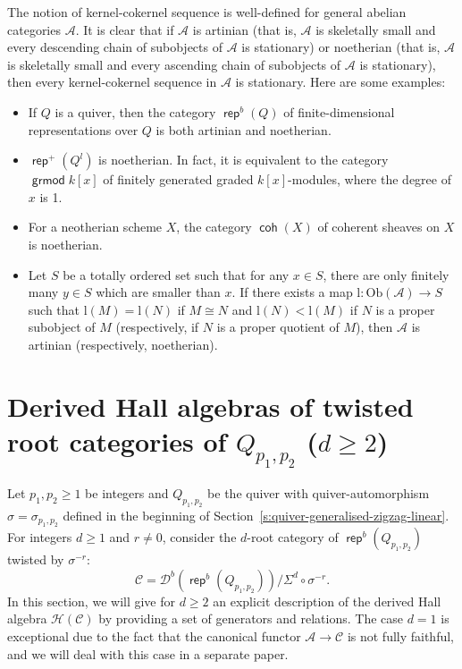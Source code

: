 \documentclass[reqno,12pt,a4paper]{amsart}
\theoremstyle{remark}
\theoremstyle{definition}
\newcommand{\opname}[1]{\operatorname{\mathsf{#1}}}
\newcommand{\grmod}{\opname{grmod}\nolimits}
\newcommand{\coh}{\opname{coh}\nolimits}
\newcommand{\rep}{\opname{rep}\nolimits}
\newcommand{\ca}{{\mathcal A}}
\newcommand{\cc}{{\mathcal C}}
\newcommand{\cd}{{\mathcal D}}
\newcommand{\ch}{{\mathcal H}}
\numberwithin{equation}{section}
\begin{document}
The notion of kernel-cokernel sequence is well-defined for general abelian categories $\ca$.
It is clear that if $\ca$ is artinian (that is, $\ca$ is skeletally small and every descending chain of subobjects of $\ca$ is stationary) or noetherian (that is, $\ca$ is skeletally small and every ascending chain of subobjects of $\ca$ is stationary), then every kernel-cokernel sequence in $\ca$ is stationary. Here are some examples:
\begin{itemize}
\item[(1)] If $Q$ is a quiver, then the category $\rep^b(Q)$ of finite-dimensional representations over $Q$ is both artinian and noetherian.
\item[(2)]$\rep^+(Q^l)$ is noetherian. In fact, it is equivalent to the category $\grmod k[x]$ of finitely generated graded $k[x]$-modules, where the degree of $x$ is 1.
\item[(3)] For a neotherian scheme $X$, the category $\coh(X)$ of coherent sheaves on $X$ is noetherian.
\item[(4)] Let $S$ be a totally ordered set such that for any $x\in S$, there are only finitely many $y\in S$ which are smaller than $x$. If there exists a map $\mathrm{l}\colon\mathrm{Ob}(\ca)\to S$ such that $\mathrm{l}(M)=\mathrm{l}(N)$ if $M\cong N$ and $\mathrm{l}(N)<\mathrm{l}(M)$ if $N$ is a proper subobject of $M$ (respectively, if $N$ is a proper quotient of $M$), then $\ca$ is artinian (respectively, noetherian).
\end{itemize}




\section{Derived Hall algebras of twisted root categories of $Q_{p_1,p_2}$ ($d\geq 2$)}
\label{s:derived-Hall-of-zigzag}

Let $p_1,p_2\geq 1$ be integers and $Q_{p_1,p_2}$ be the quiver with quiver-automorphism $\sigma=\sigma_{p_1,p_2}$ defined in the beginning of Section~\ref{s:quiver-generalised-zigzag-linear}. For integers $d\geq 1$ and $r\neq 0$, consider the $d$-root category of $\rep^b(Q_{p_1,p_2})$ twisted by $\sigma^{-r}$:
\[
\cc=\cd^b(\rep^b(Q_{p_1,p_2}))/\Sigma^d\circ\sigma^{-r}.
\]
In this section, we will give for $d\geq 2$ an explicit description of the derived Hall algebra $\ch(\cc)$ by providing a set of generators and relations. The case $d=1$ is exceptional due to the fact that the canonical functor $\ca\to\cc$ is not fully faithful, and we will deal with this case in a separate paper.
\end{document}
